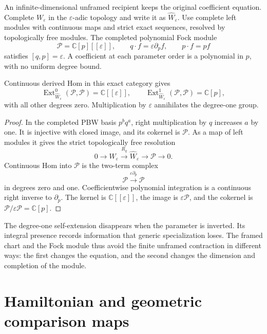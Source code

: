 An infinite-dimensional unframed recipient keeps the original
coefficient equation. Complete $W_\varepsilon$ in the
$\varepsilon$-adic topology and write it as
$\widehat W_\varepsilon$. Use complete left modules with
continuous maps and strict exact sequences, resolved by
topologically free modules. The completed polynomial Fock module
\[
 \mathcal P=\mathbb C[p][[\varepsilon]],\qquad
 q\cdot f=\varepsilon\partial_pf,\qquad p\cdot f=pf
\]
satisfies $[q,p]=\varepsilon$. A coefficient at each parameter
order is a polynomial in $p$, with no uniform degree bound.

\begin{proposition}\label{prop:vol2-integral-fock-self-extension}
Continuous derived Hom in this exact category gives
\[
 \operatorname{Ext}^0_{\widehat W_\varepsilon}(\mathcal P,\mathcal P)
     =\mathbb C[[\varepsilon]],
 \qquad
 \operatorname{Ext}^1_{\widehat W_\varepsilon}(\mathcal P,\mathcal P)
     =\mathbb C[p],
\]
with all other degrees zero. Multiplication by $\varepsilon$
annihilates the degree-one group.
\end{proposition}
\begin{proof}
In the completed PBW basis $p^bq^a$, right multiplication by
$q$ increases $a$ by one. It is injective with closed image,
and its cokernel is $\mathcal P$. As a map of left modules
it gives the strict topologically free resolution
\[
 0\longrightarrow\widehat W_\varepsilon
   \xrightarrow{R_q}\widehat W_\varepsilon
   \longrightarrow\mathcal P\longrightarrow0.
\]
Continuous Hom into $\mathcal P$ is the two-term complex
\[
 \mathcal P\xrightarrow{\varepsilon\partial_p}\mathcal P
\]
in degrees zero and one. Coefficientwise polynomial
integration is a continuous right inverse to $\partial_p$.
The kernel is $\mathbb C[[\varepsilon]]$, the image is
$\varepsilon\mathcal P$, and the cokernel is
$\mathcal P/\varepsilon\mathcal P=\mathbb C[p]$.
\end{proof}

The degree-one self-extension disappears when the parameter
is inverted. Its integral presence records information that
generic specialization loses. The framed chart and the Fock
module thus avoid the finite unframed contraction in different
ways: the first changes the equation, and the second changes
the dimension and completion of the module.

\section{Hamiltonian and geometric comparison maps}
\label{sec:vol2-derived-hamiltonian-comparison}

